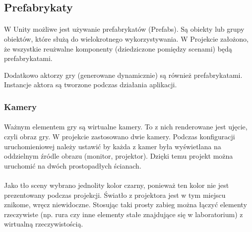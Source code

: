 \subsection{Prefabrykaty}
\paragraph{}
W Unity możliwe jest używanie prefabrykatów (Prefabs\cite{prefab}). Są obiekty lub grupy obiektów, które służą do wielokrotnego wykorzystywania. W Projekcie założono, że wszystkie reużwalne komponenty (dziedziczone pomiędzy scenami) będą prefabrykatami.

Dodatkowo aktorzy gry (generowane dynamicznie) są również prefabrykatami. Instancje aktora są tworzone podczas działania aplikacji.

\subsubsection{Kamery}
\paragraph{}
Ważnym elementem gry są wirtualne kamery. To z nich renderowane jest ujęcie, czyli obraz gry. W projekcie zastosowano dwie kamery. Podczas konfiguracji uruchomieniowej należy ustawić by każda z kamer była wyświetlana na oddzielnym źródle obrazu (monitor, projektor). Dzięki temu projekt można uruchomić na dwóch prostopadłych ścianach.
\paragraph{}
Jako tło sceny wybrano jednolity kolor czarny, ponieważ ten kolor nie jest prezentowany podczas projekcji. Światło z projektora jest w tym miejscu znikome, wręcz niewidoczne. Stosując taki prosty zabieg można łączyć elementy rzeczywiste (np. rura czy inne elementy stałe znajdujące się w laboratorium) z wirtualną rzeczywistością.

